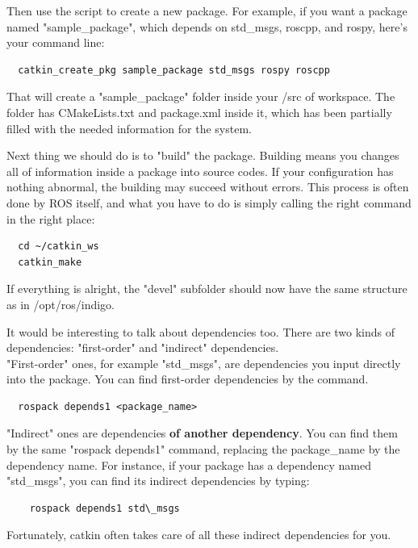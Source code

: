 \documentclass[pdftex,12pt,a4paper]{article}
\begin{document}
  \newpage
  Then use the script to create a new package. For example, if you want a package named "sample\_package", which depends on std\_msgs, roscpp, and rospy, here's your command line:
  \begin{lstlisting}
  catkin_create_pkg sample_package std_msgs rospy roscpp
  \end{lstlisting}
  That will create a "sample\_package" folder inside your /src of workspace. The folder has CMakeLists.txt and package.xml inside it, which has been partially filled with the needed information for the system.\par
  Next thing we should do is to "build" the package. Building means you changes all of information inside a package into source codes. If your configuration has nothing abnormal, the building may succeed without errors. This process is often done by ROS itself, and what you have to do is simply calling the right command in the right place:
  \begin{lstlisting}
  cd ~/catkin_ws
  catkin_make
  \end{lstlisting}
  If everything is alright, the "devel" subfolder should now have the same structure as in /opt/ros/indigo.\par
  It would be interesting to talk about dependencies too. There are two kinds of dependencies: "first-order" and "indirect" dependencies.\\
  "First-order" ones, for example "std\_msgs", are dependencies you input directly into the package. You can find first-order dependencies by the command.
  \begin{lstlisting}
  rospack depends1 <package_name> 
  \end{lstlisting}
  "Indirect" ones are dependencies \textbf{of another dependency}. You can find them by the same "rospack depends1" command, replacing the package\_name by the dependency name. For instance, if your package has a dependency named "std\_msgs", you can find its indirect dependencies by typing:
  \begin{lstlisting}
    rospack depends1 std\_msgs
  \end{lstlisting}
  Fortunately, catkin often takes care of all these indirect dependencies for you.
  
  \newpage
\end{document}
